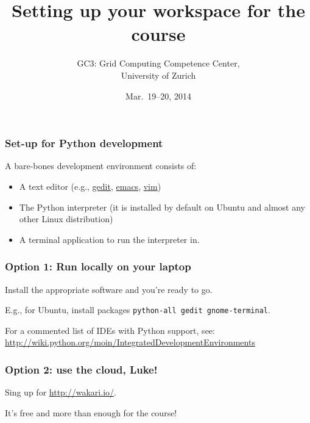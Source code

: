 \documentclass[english,serif,mathserif,xcolor=pdftex,dvipsnames,table]{beamer}
\title[Set-up]{%
  Setting up your workspace for the course
}
\author[GC3]{%
  GC3: Grid Computing Competence Center, \\
  University of Zurich
}
\date{Mar.~19--20, 2014}
\begin{document}
\maketitle


\begin{frame}
  \frametitle{Set-up for Python development}
  A bare-bones development environment consists of:
  \begin{itemize}
  \item A text editor (e.g.,
    \href{http://en.wikipedia.org/wiki/Gedit}{gedit},
    \href{http://hide1713.wordpress.com/2009/01/30/setup-perfect-python-environment-in-emacs/}{emacs},
    \href{http://blog.dispatched.ch/2009/05/24/vim-as-python-ide/}{vim})
  \item The Python interpreter (it is installed by default on
    Ubuntu and almost any other Linux distribution)
  \item A terminal application to run the interpreter in.
  \end{itemize}
\end{frame}


\begin{frame}[fragile]
  \frametitle{Option 1: Run locally on your laptop}

  Install the appropriate software and you're ready to go.

  \+
  E.g., for Ubuntu, install packages \texttt{python-all gedit gnome-terminal}.

  \+ For a commented list of {IDEs} with Python support, see:
  {\footnotesize
    \url{http://wiki.python.org/moin/IntegratedDevelopmentEnvironments}}
\end{frame}


\begin{frame}
  \frametitle{Option 2: use the cloud, Luke!}

  Sing up for \url{http://wakari.io/}.

  \+
  It's free and more than enough for the course!
\end{frame}
\end{document}
